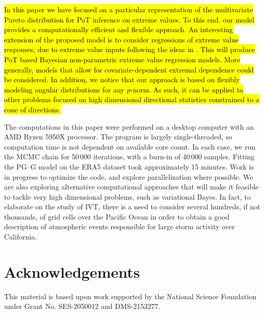 \documentclass[iicol,sn-basic]{sn-jnl}
\theoremstyle{thmstyleone}
\begin{document}
\hl{In this paper we have focused on a particular representation of the multivariate Pareto distribution for PoT inference on extreme values. To this end, our model  provides a computationally efficient and flexible approach. An interesting extension of the proposed model is to consider regressions of extreme value responses, due to extreme value inputs following the ideas in  \mbox{\cite{carvalho2022}}. This will produce PoT based Bayesian non-parametric extreme value regression models. More generally,  models that allow for covariate-dependent extremal dependence \mbox{\citep{mhalla2019}} could be considered. In addition, we notice that our approach is based on flexibly  modeling angular distributions for any $p$-norm. As such, it can be applied to other problems focused on high dimensional directional statistics constrained to a cone of directions.}

The computations in this paper were performed on a desktop computer with an AMD Ryzen 5950X processor. The program is largely single-threaded, so computation time is not dependent on available core count.  In each case, we run the MCMC chain for 50\,000 iterations, with a burn-in of 40\,000 samples.  Fitting the PG--G model on the ERA5 dataset took approximately 15 minutes.  Work is in progress to optimize the code, and explore parallelization where possible.  We are also exploring alternative computational approaches that will make it feasible to tackle very high dimensional problems, such as variational Bayes. In fact, to elaborate on the study of IVT, there is a need to consider several hundreds, if not thousands, of grid cells over the Pacific Ocean in order to obtain a good description of atmospheric  events responsible for large storm activity over California.

\section*{Acknowledgements}
This material is based upon work supported by the National Science Foundation under Grant No. SES-2050012 and DMS-2153277.


\end{document}
